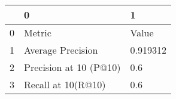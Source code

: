 \begin{tabular}{lll}
\toprule
{} &                       0 &         1 \\
\midrule
0 &                  Metric &     Value \\
1 &       Average Precision &  0.919312 \\
2 &  Precision at 10 (P@10) &       0.6 \\
3 &      Recall at 10(R@10) &       0.6 \\
\bottomrule
\end{tabular}

